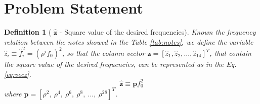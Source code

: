 \documentclass[11pt,twocolumn]{article}
\newtheorem{mydef}{Definition}[section]
\begin{document}
\section{Problem Statement}


\begin{mydef}[
$\mathbf{\hat{z}}$ - Square value of the desired frequencies]
Known the frequency relation between the notes showed in the Table \ref{tab:notes}, 
we define the variable $\hat{z}_i\equiv \hat{f}_i^2 = \left( {\rho}^{i} f_0 \right)^{2} $,
so that the  column vector $\mathbf{\hat{z}}= \left[ \hat{z}_1, \hat{z}_2, \hdots, \hat{z}_{14}\right]^{T} $, 
that contain the square value of the desired frequencies, 
can be represented as in the Eq. \ref{eq:vecz}.
\begin{equation} \label{eq:vecz}
\mathbf{\hat{z}}
\equiv \mathbf{p} f_{0}^2
\end{equation}
where $\mathbf{p}=[\rho^2,~\rho^4,~\rho^6,~\rho^8,~...,~\rho^{28}]^T$.
\end{mydef}
\end{document}
